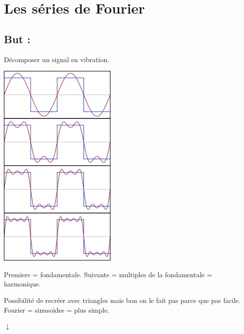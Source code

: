 \documentclass{article}
\begin{document}
\section{Les s\'eries de Fourier}

\subsection{But :}
D\'ecomposer un signal en vibration.
\newline
\begin{center}
	\includegraphics{img/Fourier_Series.png}
\end{center}
Premiere = fondamentale.\newline
Suivante = multiples de la fondamentale = harmonique.\newline

Possibilit\'e de recr\'eer avec triangles mais bon on le fait pas parce que pas facile.\newline
Fourier = sinusoides = plus simple.

\begin{center}$ \downarrow $\end{center}
\end{document}
